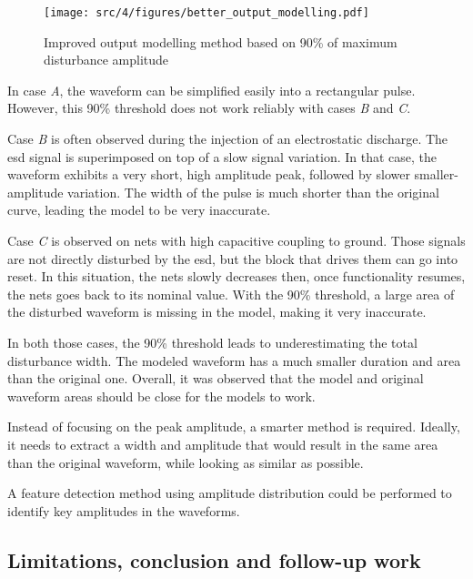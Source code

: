 \begin{figure}[!h]
  \centering
  \texttt{[image: src/4/figures/better\_output\_modelling.pdf]}
  \caption{Improved output modelling method based on 90\% of maximum disturbance amplitude}
  \label{fig:impact-single-failure-criteria}
\end{figure}

In case \textit{A}, the waveform can be simplified easily into a rectangular pulse.
However, this 90\% threshold does not work reliably with cases \textit{B} and \textit{C}.

Case \textit{B} is often observed during the injection of an electrostatic discharge.
The \gls{esd} signal is superimposed on top of a slow signal variation.
In that case, the waveform exhibits a very short, high amplitude peak, followed by slower smaller-amplitude variation.
The width of the pulse is much shorter than the original curve, leading the model to be very inaccurate.

Case \textit{C} is observed on nets with high capacitive coupling to ground.
Those signals are not directly disturbed by the \gls{esd}, but the block that drives them can go into reset.
In this situation, the nets slowly decreases then, once functionality resumes, the nets goes back to its nominal value.
With the 90\% threshold, a large area of the disturbed waveform is missing in the model, making it very inaccurate.

In both those cases, the 90\% threshold leads to underestimating the total disturbance width.
The modeled waveform has a much smaller duration and area than the original one.
Overall, it was observed that the model and original waveform areas should be close for the models to work.

Instead of focusing on the peak amplitude, a smarter method is required.
Ideally, it needs to extract a width and amplitude that would result in the same area than the original waveform, while looking as similar as possible.

A feature detection method using amplitude distribution could be performed to identify key amplitudes in the waveforms.

\subsection{Limitations, conclusion and follow-up work}

